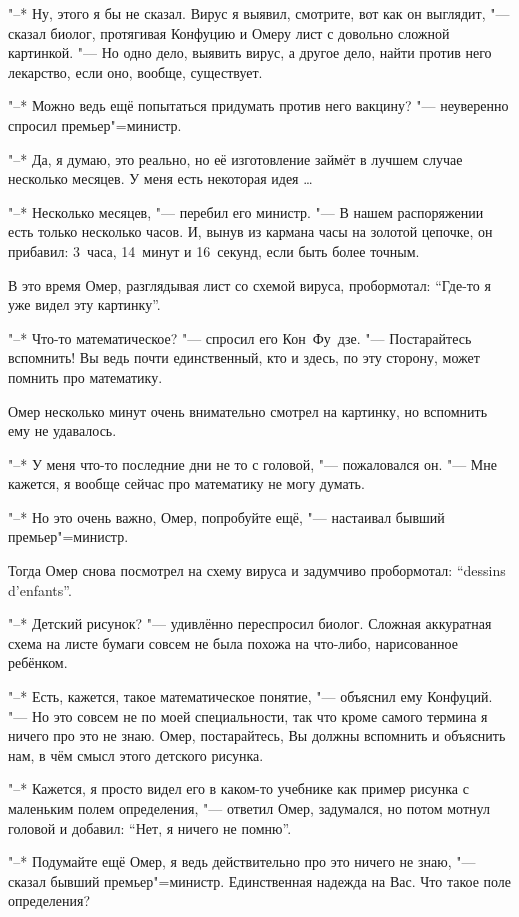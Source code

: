 "--* Ну, этого я бы не сказал.
Вирус я выявил, смотрите, вот как он выглядит, "--- сказал биолог, протягивая
Конфуцию и Омеру лист с довольно сложной картинкой.
"--- Но одно дело, выявить вирус, а другое дело, найти против него лекарство,
если оно, вообще, существует.

"--* Можно ведь ещё попытаться придумать против него вакцину? "--- неуверенно
спросил премьер"=министр.

"--* Да, я думаю, это реально, но её изготовление займёт в лучшем случае
несколько месяцев.
У меня есть некоторая идея \ldots

"--* Несколько месяцев, "--- перебил его министр.
"--- В нашем распоряжении есть только несколько часов.
И, вынув из кармана часы на золотой цепочке, он прибавил: 3~часа, 14~минут и
16~секунд, если быть более точным.

В это время Омер, разглядывая лист со схемой вируса, пробормотал:
\enquote{Где-то я уже видел эту картинку}.

"--* Что-то математическое? "--- спросил его Кон~Фу~дзе.
"--- Постарайтесь вспомнить!
Вы ведь почти единственный, кто и здесь, по эту сторону, может помнить про
математику.

Омер несколько минут очень внимательно смотрел на картинку, но вспомнить ему не
удавалось.

"--* У меня что-то последние дни не то с головой, "--- пожаловался он.
"--- Мне кажется, я вообще сейчас про математику не могу думать.

"--* Но это очень важно, Омер, попробуйте ещё, "--- настаивал бывший
премьер"=министр.

Тогда Омер снова посмотрел на схему вируса и задумчиво пробормотал:
\enquote{\foreignlanguage{french}{dessins d'enfants}}.

"--* Детский рисунок? "--- удивлённо переспросил биолог.
Сложная аккуратная схема на листе бумаги совсем не была похожа на что-либо,
нарисованное ребёнком.

"--* Есть, кажется, такое математическое понятие, "--- объяснил ему Конфуций.
"--- Но это совсем не по моей специальности, так что кроме самого термина я
ничего про это не знаю.
Омер, постарайтесь, Вы должны вспомнить и объяснить нам, в чём смысл этого
детского рисунка.

"--* Кажется, я просто видел его в каком-то учебнике как пример рисунка с
маленьким полем определения, "--- ответил Омер, задумался, но потом мотнул
головой и добавил: \enquote{Нет, я ничего не помню}.

"--* Подумайте ещё Омер, я ведь действительно про это ничего не знаю, "---
сказал бывший премьер"=министр.
Единственная надежда на Вас.
Что такое поле определения?

